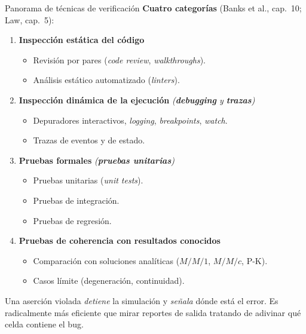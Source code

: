 \documentclass[aspectratio=1610, 10pt]{beamer}
\begin{document}
\begin{frame}{Panorama de técnicas de verificación}
  \footnotesize
  \textbf{Cuatro categorías} (Banks et al., cap.\ 10; Law, cap.\ 5):

  \vspace{4pt}
  \begin{enumerate}\itemsep4pt
    \item \textbf{Inspección estática del código}
      \begin{itemize}\scriptsize\itemsep0pt
        \item Revisión por pares (\emph{code review}, \emph{walkthroughs}).
        \item Análisis estático automatizado (\emph{linters}).
      \end{itemize}
    \item \textbf{Inspección dinámica de la ejecución}
      \hfill {\small\textit{(\textbf{debugging} y \textbf{trazas})}}
      \begin{itemize}\scriptsize\itemsep0pt
        \item Depuradores interactivos, \emph{logging}, \emph{breakpoints}, \emph{watch}.
        \item Trazas de eventos y de estado.
      \end{itemize}
    \item \textbf{Pruebas formales}
      \hfill {\small\textit{(\textbf{pruebas unitarias})}}
      \begin{itemize}\scriptsize\itemsep0pt
        \item Pruebas unitarias (\emph{unit tests}).
        \item Pruebas de integración.
        \item Pruebas de regresión.
      \end{itemize}
    \item \textbf{Pruebas de coherencia con resultados conocidos}
      \begin{itemize}\scriptsize\itemsep0pt
        \item Comparación con soluciones analíticas ($M/M/1$, $M/M/c$, P-K).
        \item Casos límite (degeneración, continuidad).
      \end{itemize}
  \end{enumerate}

  \vspace{4pt}
  \begin{metodobox}
    \scriptsize
    Una aserción violada \emph{detiene} la simulación y \emph{señala} dónde está
    el error. Es radicalmente más eficiente que mirar reportes de salida tratando
    de adivinar qué celda contiene el bug.
  \end{metodobox}
\end{frame}
\end{document}
